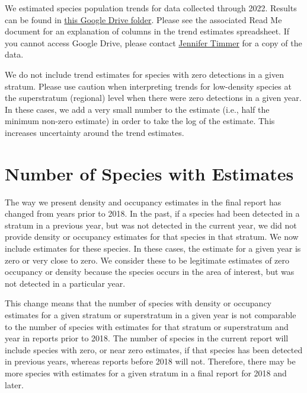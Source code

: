 \documentclass[
  letterpaper,
  DIV=11,
  numbers=noendperiod,
  oneside]{scrreprt}
\begin{document}
We estimated species population trends for data collected through 2022.
Results can be found in
\href{https://drive.google.com/drive/folders/1-ges-7CkLaHHk-BCtNV-SEvIyoqIHhxm?usp=share_link}{this
Google Drive folder}. Please see the associated Read Me document for an
explanation of columns in the trend estimates spreadsheet. If you cannot
access Google Drive, please contact
\href{mailto:\%20jennifer.timmer@birdconservancy.org}{Jennifer Timmer}
for a copy of the data.

We do not include trend estimates for species with zero detections in a
given stratum. Please use caution when interpreting trends for
low-density species at the superstratum (regional) level when there were
zero detections in a given year. In these cases, we add a very small
number to the estimate (i.e., half the minimum non-zero estimate) in
order to take the log of the estimate. This increases uncertainty around
the trend estimates.

\hypertarget{number-of-species-with-estimates}{%
\section*{Number of Species with
Estimates}\label{number-of-species-with-estimates}}


The way we present density and occupancy estimates in the final report
has changed from years prior to 2018. In the past, if a species had been
detected in a stratum in a previous year, but was not detected in the
current year, we did not provide density or occupancy estimates for that
species in that stratum. We now include estimates for these species. In
these cases, the estimate for a given year is zero or very close to
zero. We consider these to be legitimate estimates of zero occupancy or
density because the species occurs in the area of interest, but was not
detected in a particular year.

This change means that the number of species with density or occupancy
estimates for a given stratum or superstratum in a given year is not
comparable to the number of species with estimates for that stratum or
superstratum and year in reports prior to 2018. The number of species in
the current report will include species with zero, or near zero
estimates, if that species has been detected in previous years, whereas
reports before 2018 will not. Therefore, there may be more species with
estimates for a given stratum in a final report for 2018 and later.
\end{document}
